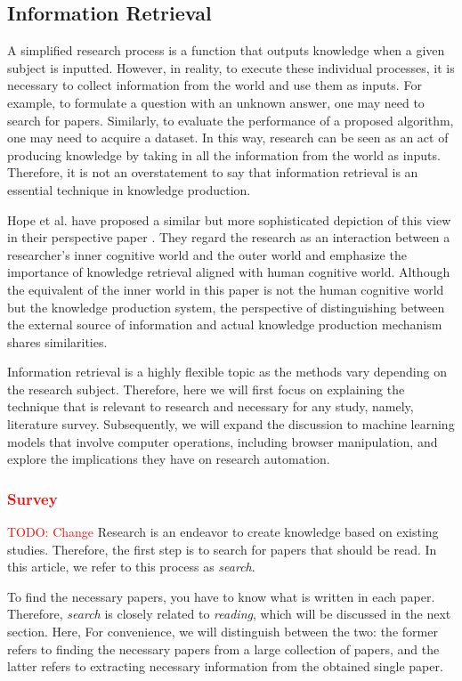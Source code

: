 \documentclass{book}
\begin{document}
\subsection{Information Retrieval}
A simplified research process is a function that outputs knowledge when a given subject is inputted. However, in reality, to execute these individual processes, it is necessary to collect information from the world and use them as inputs. For example, to formulate a question with an unknown answer, one may need to search for papers. Similarly, to evaluate the performance of a proposed algorithm, one may need to acquire a dataset. In this way, research can be seen as an act of producing knowledge by taking in all the information from the world as inputs. Therefore, it is not an overstatement to say that information retrieval is an essential technique in knowledge production. 

Hope et al. have proposed a similar but more sophisticated depiction of this view in their perspective paper \cite{hope2022computational}. They regard the research as an interaction between a researcher’s inner cognitive world and the outer world and emphasize the importance of knowledge retrieval aligned with human cognitive world. Although the equivalent of the inner world in this paper is not the human cognitive world but the knowledge production system, the perspective of distinguishing between the external source of information and actual knowledge production mechanism shares similarities.

Information retrieval is a highly flexible topic as the methods vary depending on the research subject. Therefore, here we will first focus on explaining the technique that is relevant to research and necessary for any study, namely, literature survey. Subsequently, we will expand the discussion to machine learning models that involve computer operations, including browser manipulation, and explore the implications they have on research automation.

\subsubsection{\textcolor{red}{Survey}}
\textcolor{red}{TODO: Change}
Research is an endeavor to create knowledge based on existing studies. Therefore, the first step is to search for papers that should be read. In this article, we refer to this process as \textit{search}.

To find the necessary papers, you have to know what is written in each paper. Therefore, \textit{search} is closely related to \textit{reading}, which will be discussed in the next section. Here, For convenience, we will distinguish between the two: the former refers to finding the necessary papers from a large collection of papers, and the latter refers to extracting necessary information from the obtained single paper.
\end{document}

